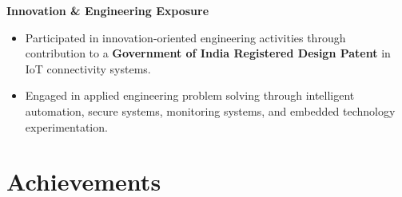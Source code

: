 \documentclass[a4paper,11pt]{article}
\begin{document}
\vspace{4pt}

\textbf{Innovation \& Engineering Exposure}
\begin{itemize}

    \item Participated in innovation-oriented engineering activities through contribution to a \textbf{Government of India Registered Design Patent} in IoT connectivity systems.

    \item Engaged in applied engineering problem solving through intelligent automation, secure systems, monitoring systems, and embedded technology experimentation.

\end{itemize}





\section{Achievements}
\end{document}
